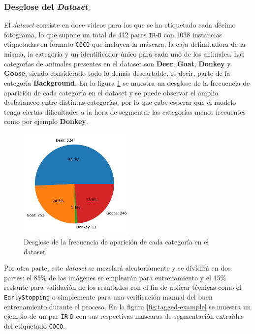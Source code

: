 \documentclass[12pt,a4paper]{report}
\begin{document}
\subsubsection{Desglose del \textit{Dataset}}
El \textit{dataset} consiste en doce videos para los que se ha etiquetado cada décimo fotograma, lo que supone un total de 412 pares \texttt{IR}-\texttt{D} con 1038 instancias etiquetadas en formato \texttt{COCO} que incluyen la máscara, la caja delimitadora de la misma, la categoría y un identificador único para cada uno de los animales. Las categorías de animales presentes en el dataset son \textbf{Deer}, \textbf{Goat}, \textbf{Donkey} y \textbf{Goose}, siendo considerado todo lo demás descartable, es decir, parte de la categoría \textbf{Background}. En la figura \ref{fig:dataset-breakdown} se muestra un desglose de la frecuencia de aparición de cada categoría en el dataset y se puede observar el amplio desbalanceo entre distintas categorías, por lo que cabe esperar que el modelo tenga ciertas dificultades a la hora de segmentar las categorías menos frecuentes como por ejemplo \textbf{Donkey}.
\begin{figure}
    \centering
    \includegraphics[width=0.5\textwidth]{media/data/dataset_breakdown.png}
    \caption{Desglose de la frecuencia de aparición de cada categoría en el dataset}
    \label{fig:dataset-breakdown}
\end{figure}
Por otra parte, este \textit{dataset} se mezclará aleatoriamente y se dividirá en dos partes: el 85\% de las imágenes se emplearán para entrenamiento y el 15\% restante para validación de los resultados con el fin de aplicar técnicas como el \texttt{EarlyStopping} o simplemente para una verificación manual del buen entrenamiento durante el proceso. En la figura \ref{fig:tagged-example} se muestra un ejemplo de un par \texttt{IR}-\texttt{D} con sus respectivas máscaras de segmentación extraidas del etiquetado \texttt{COCO}.
\end{document}
